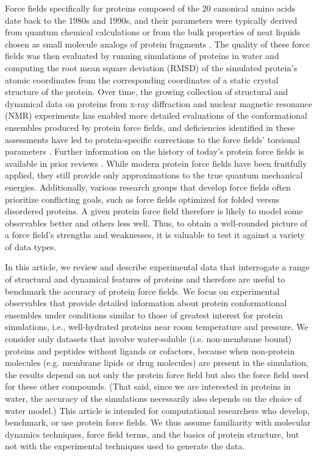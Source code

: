 \documentclass[9pt,review]{livecoms}
\begin{document}
Force fields specifically for proteins composed of the 20 canonical amino acids date back to the 1980s and 1990s, and their parameters were typically derived from quantum chemical calculations or from the bulk properties of neat liquids chosen as small molecule analogs of protein fragments \cite{jorgensen_opls_1988,cornell_second_1995,mackerell_all-atom_1998}.
The quality of these force fields was then evaluated by running simulations of proteins in water and computing the root mean square deviation (RMSD) of the simulated protein’s atomic coordinates from the corresponding coordinates of a static crystal structure of the protein.
Over time, the growing collection of structural and dynamical data on proteins from x-ray diffraction and nuclear magnetic resonance (NMR) experiments has enabled more detailed evaluations of the conformational ensembles produced by protein force fields, and deficiencies identified in these assessments have led to protein-specific corrections to the force fields’ torsional parameters \cite{lindorff-larsen_improved_2010,best_optimization_2012,mackerell_jr_extending_2004,Hornak:2006:Proteins,Maier:2015:J.Chem.TheoryComput.,tian_ff19sb_2020}.
Further information on the history of today’s protein force fields is available in prior reviews \cite{lifson_recent_1973,ponder_force_2003,guvench_comparison_2008,zhu_recent_2012,dauber-osguthorpe_biomolecular_2019}.
While modern protein force fields have been fruitfully applied, they still provide only approximations to the true quantum mechanical energies.
Additionally, various research groups that develop force fields often prioritize conflicting goals, such as force fields optimized for folded versus disordered proteins.
A given protein force field therefore is likely to model some observables better and others less well.
Thus, to obtain a well-rounded picture of a force field’s strengths and weaknesses, it is valuable to test it against a variety of data types. 

In this article, we review and describe experimental data that interrogate a range of structural and dynamical features of proteins and therefore are useful to benchmark the accuracy of protein force fields.
We focus on experimental observables that provide detailed information about protein conformational ensembles under conditions similar to those of greatest interest for protein simulations, i.e., well-hydrated proteins near room temperature and pressure.
We consider only datasets that involve water-soluble (i.e. non-membrane bound) proteins and peptides without ligands or cofactors, because when non-protein molecules (e.g. membrane lipids or drug molecules) are present in the simulation, the results depend on not only the protein force field but also the force field used for these other compounds.
(That said, since we are interested in proteins in water, the accuracy of the simulations necessarily also depends on the choice of water model.)
This article is intended for computational researchers who develop, benchmark, or use protein force fields.
We thus assume familiarity with molecular dynamics techniques, force field terms, and the basics of protein structure, but not with the experimental techniques used to generate the data.
\end{document}
